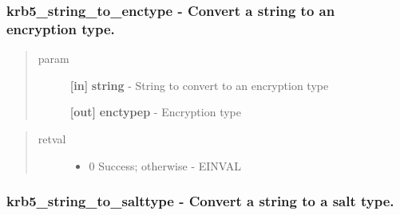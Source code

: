 \documentclass[letterpaper,10pt,english]{sphinxmanual}
\begin{document}
\subsubsection{krb5\_string\_to\_enctype -  Convert a string to an encryption type.}
\label{appdev/refs/api/krb5_string_to_enctype::doc}\label{appdev/refs/api/krb5_string_to_enctype:krb5-string-to-enctype-convert-a-string-to-an-encryption-type}

\begin{fulllineitems}
\label{appdev/refs/api/krb5_string_to_enctype:c.krb5_string_to_enctype}
\end{fulllineitems}

\begin{quote}\begin{description}
\item[{param}] \leavevmode
\textbf{{[}in{]}} \textbf{string} - String to convert to an encryption type

\textbf{{[}out{]}} \textbf{enctypep} - Encryption type

\end{description}\end{quote}
\begin{quote}\begin{description}
\item[{retval}] \leavevmode\begin{itemize}
\item {} 
0   Success; otherwise - EINVAL

\end{itemize}

\end{description}\end{quote}


\subsubsection{krb5\_string\_to\_salttype -  Convert a string to a salt type.}
\label{appdev/refs/api/krb5_string_to_salttype:krb5-string-to-salttype-convert-a-string-to-a-salt-type}\label{appdev/refs/api/krb5_string_to_salttype::doc}

\begin{fulllineitems}
\label{appdev/refs/api/krb5_string_to_salttype:c.krb5_string_to_salttype}
\end{fulllineitems}
\end{document}
